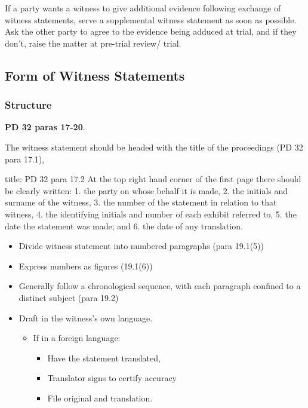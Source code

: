 \documentclass[
]{article}
\newenvironment{Shaded}{}{}
\newcommand{\NormalTok}[1]{#1}
\providecommand{\tightlist}{%
  \setlength{\itemsep}{0pt}\setlength{\parskip}{0pt}}
\begin{document}
If a party wants a witness to give additional evidence following
exchange of witness statements, serve a supplemental witness statement
as soon as possible. Ask the other party to agree to the evidence being
adduced at trial, and if they don't, raise the matter at pre-trial
review/ trial.

\hypertarget{form-of-witness-statements}{%
\subsection{Form of Witness
Statements}\label{form-of-witness-statements}}

\hypertarget{structure}{%
\subsubsection{Structure}\label{structure}}

\textbf{PD 32 paras 17-20}.

The witness statement should be headed with the title of the proceedings
(PD 32 para 17.1),

\begin{Shaded}
\begin{Highlighting}[]
\NormalTok{title: PD 32 para 17.2}
\NormalTok{At the top right hand corner of the first page there should be clearly written:}
\NormalTok{1. the party on whose behalf it is made,}
\NormalTok{2. the initials and surname of the witness,}
\NormalTok{3. the number of the statement in relation to that witness,}
\NormalTok{4. the identifying initials and number of each exhibit referred to,}
\NormalTok{5. the date the statement was made; and}
\NormalTok{6. the date of any translation.}
\end{Highlighting}
\end{Shaded}

\begin{itemize}
\tightlist
\item
  Divide witness statement into numbered paragraphs (para 19.1(5))
\item
  Express numbers as figures (19.1(6))
\item
  Generally follow a chronological sequence, with each paragraph
  confined to a distinct subject (para 19.2)
\item
  Draft in the witness's own language.

  \begin{itemize}
  \tightlist
  \item
    If in a foreign language:

    \begin{itemize}
    \tightlist
    \item
      Have the statement translated,
    \item
      Translator signs to certify accuracy
    \item
      File original and translation.
    \end{itemize}
  \end{itemize}
\end{itemize}
\end{document}
